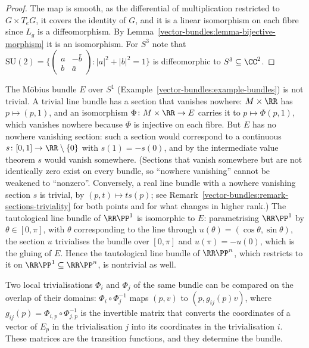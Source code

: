 \begin{proof}
The map is smooth, as the differential of multiplication restricted to $G \times T_eG$, it covers the identity of $G$, and it is a linear isomorphism on each fibre since $L_g$ is a diffeomorphism. By
Lemma~\ref{vector-bundles:lemma-bijective-morphism} it is an isomorphism. For $S^3$ note that
$\mathrm{SU}(2) = \{\begin{pmatrix}a & -\bar b\\ b & \bar a\end{pmatrix} : |a|^2 + |b|^2 = 1\}$ is diffeomorphic to $S^3 \subseteq \CC^2$.
\end{proof}

\begin{counterexample}\label{vector-bundles:counterexample-mobius}
The M\"obius bundle $E$ over $S^1$ (Example~\ref{vector-bundles:example-bundles}) is not trivial. A trivial line bundle has a section that vanishes nowhere: $M \times \RR$ has $p \mapsto (p, 1)$, and an isomorphism $\Phi \colon M \times \RR \to E$ carries it to
$p \mapsto \Phi(p, 1)$, which vanishes nowhere because $\Phi$ is injective on each fibre. But $E$ has no nowhere vanishing section: such a section would correspond to a continuous
$s \colon [0, 1] \to \RR \setminus \{0\}$ with $s(1) = -s(0)$, and by the intermediate value theorem $s$ would vanish somewhere. (Sections that vanish somewhere but are not identically zero exist on every
bundle, so ``nowhere vanishing'' cannot be weakened to ``nonzero''. Conversely, a real line bundle with a nowhere vanishing section $s$ is trivial, by $(p, t) \mapsto ts(p)$; see
Remark~\ref{vector-bundles:remark-sections-triviality} for both points and for what changes in higher rank.) The tautological line bundle of $\RR\PP^1$ is isomorphic to $E$: parametrising
$\RR\PP^1$ by $\theta \in [0, \pi]$, with $\theta$ corresponding to the line through $u(\theta) = (\cos\theta, \sin\theta)$, the section $u$ trivialises the bundle over $[0, \pi]$ and $u(\pi) = -u(0)$, which is the gluing of $E$. Hence the
tautological line bundle of $\RR\PP^n$, which restricts to it on $\RR\PP^1 \subseteq \RR\PP^n$, is nontrivial as well.
\end{counterexample}

Two local trivialisations $\Phi_i$ and $\Phi_j$ of the same bundle can be compared on the overlap of their domains: $\Phi_i \circ \Phi_j^{-1}$ maps $(p, v)$ to
$(p, g_{ij}(p)v)$, where $g_{ij}(p) = \Phi_{i,p} \circ \Phi_{j,p}^{-1}$ is the invertible matrix that converts the coordinates of a vector of $E_p$ in the trivialisation $j$ into
its coordinates in the trivialisation $i$. These matrices are the transition functions, and they determine the bundle.

